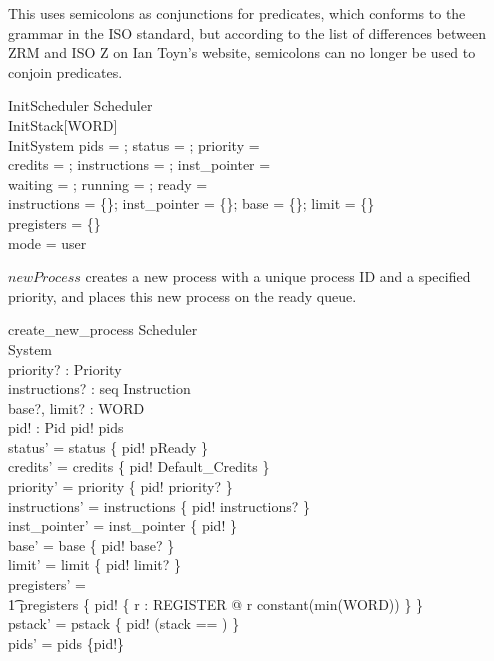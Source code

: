 This uses semicolons as conjunctions for predicates, which conforms to
the grammar in the ISO standard, but according to the list of
differences between ZRM and ISO Z on Ian Toyn's website, semicolons
can no longer be used to conjoin predicates.

\begin{schema}{InitScheduler}
    Scheduler\\
    InitStack[WORD]\\
    InitSystem
\where
    pids = \emptyset; status = \emptyset; priority = \emptyset\\
    credits = \emptyset; instructions = \emptyset; inst\_pointer = \emptyset\\
    waiting = \emptyset; running = \emptyset; ready = \langle \rangle\\
    instructions = \{\}; inst\_pointer = \{\}; base = \{\}; limit = \{\}\\
    pregisters = \{\}\\
    mode = user
\end{schema}

$newProcess$ creates a new process with a unique process ID and a
specified priority, and places this new process on the ready queue.

\begin{schema}{create\_new\_process}
    \Delta Scheduler\\
    \Xi System\\
    priority? : Priority\\
    instructions? : seq Instruction\\
    base?, limit? : WORD\\
    pid! : Pid
\where
    pid! \notin pids\\
    status' = status \cup \{ pid! \mapsto pReady \}\\
    credits' = credits \cup \{ pid! \mapsto Default\_Credits \}\\
    priority' = priority \cup \{ pid! \mapsto priority? \}\\
    instructions' = instructions \cup \{ pid! \mapsto instructions? \}\\
    inst\_pointer' = inst\_pointer \cup \{ pid!  \}\\
    base' = base \cup \{ pid! \mapsto base? \}\\
    limit' = limit \cup \{ pid! \mapsto limit? \}\\
    pregisters' =\\
	\t1 pregisters \cup \{ pid! \mapsto \{ r : REGISTER @ r \mapsto constant(min(WORD)) \} \}\\
    pstack' = pstack \cup \{ pid! \mapsto (\lblot stack == \langle \rangle \rblot) \}\\
    pids' = pids \cup \{pid!\}
\end{schema}

